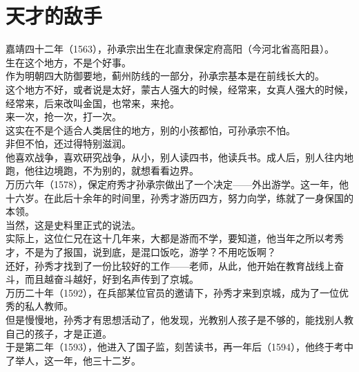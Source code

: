 \section{天才的敌手}
\ifnum{}
	\begin{multicols}{\theparacolNo}
\fi
嘉靖四十二年（1563），孙承宗出生在北直隶保定府高阳（今河北省高阳县）。\\

生在这个地方，不是个好事。\\

作为明朝四大防御要地，蓟州防线的一部分，孙承宗基本是在前线长大的。\\

这个地方不好，或者说是太好，蒙古人强大的时候，经常来，女真人强大的时候，经常来，后来改叫金国，也常来，来抢。\\

来一次，抢一次，打一次。\\

这实在不是个适合人类居住的地方，别的小孩都怕，可孙承宗不怕。\\

非但不怕，还过得特别滋润。\\

他喜欢战争，喜欢研究战争，从小，别人读四书，他读兵书。成人后，别人往内地跑，他往边境跑，不为别的，就想看看边界。\\

万历六年（1578），保定府秀才孙承宗做出了一个决定——外出游学。这一年，他十六岁。在此后十余年的时间里，孙秀才游历四方，努力向学，练就了一身保国的本领。\\

当然，这是史料里正式的说法。\\

实际上，这位仁兄在这十几年来，大都是游而不学，要知道，他当年之所以考秀才，不是为了报国，说到底，是混口饭吃，游学？不用吃饭啊？\\

还好，孙秀才找到了一份比较好的工作——老师，从此，他开始在教育战线上奋斗，而且越奋斗越好，好到名声传到了京城。\\

万历二十年（1592），在兵部某位官员的邀请下，孙秀才来到京城，成为了一位优秀的私人教师。\\

但是慢慢地，孙秀才有思想活动了，他发现，光教别人孩子是不够的，能找别人教自己的孩子，才是正道。\\

于是第二年（1593），他进入了国子监，刻苦读书，再一年后（1594），他终于考中了举人，这一年，他三十二岁。\\


\end{multicols}
